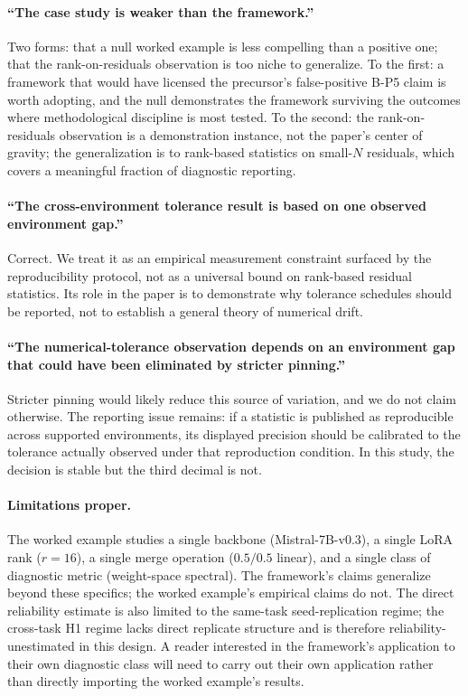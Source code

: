 \documentclass[10pt]{article}
\begin{document}
\paragraph{``The case study is weaker than the framework.''} Two
forms: that a null worked example is less compelling than a
positive one; that the rank-on-residuals observation is too niche
to generalize. To the first: a framework that would have licensed
the precursor's false-positive B-P5 claim
\citep{anonymized2026descriptive} is worth adopting, and the null
demonstrates the framework surviving the outcomes where
methodological discipline is most tested. To the second: the
rank-on-residuals observation is a demonstration instance, not the
paper's center of gravity; the generalization is to rank-based
statistics on small-$N$ residuals, which covers a meaningful
fraction of diagnostic reporting.

\paragraph{``The cross-environment tolerance result is based on
one observed environment gap.''} Correct. We treat it as an
empirical measurement constraint surfaced by the reproducibility
protocol, not as a universal bound on rank-based residual
statistics. Its role in the paper is to demonstrate why
tolerance schedules should be reported, not to establish a
general theory of numerical drift.

\paragraph{``The numerical-tolerance observation depends on an
environment gap that could have been eliminated by stricter
pinning.''} Stricter pinning would likely reduce this source of
variation, and we do not claim otherwise. The reporting issue
remains: if a statistic is published as reproducible across
supported environments, its displayed precision should be
calibrated to the tolerance actually observed under that
reproduction condition. In this study, the decision is stable
but the third decimal is not.

\paragraph{Limitations proper.} The worked example studies a single
backbone (Mistral-7B-v0.3), a single LoRA rank ($r = 16$), a single
merge operation ($0.5/0.5$ linear), and a single class of diagnostic
metric (weight-space spectral). The framework's claims generalize
beyond these specifics; the worked example's empirical claims do
not. The direct reliability estimate is also limited to the
same-task seed-replication regime; the cross-task H1 regime lacks
direct replicate structure and is therefore reliability-unestimated
in this design. A reader interested in the framework's application
to their own diagnostic class will need to carry out their own
application rather than directly importing the worked example's
results.
\end{document}
